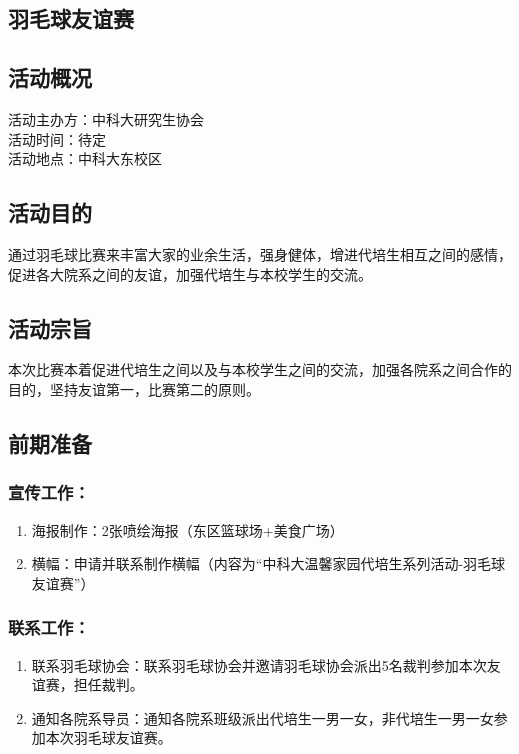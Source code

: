 \documentclass{article}
\begin{document}
\begin{CJK}{UTF8}{gbsn}

	\section{羽毛球友谊赛}
	\subsection{活动概况}
		活动主办方：中科大研究生协会\\
		活动时间：待定\\
		活动地点：中科大东校区\\
	\subsection{活动目的}
通过羽毛球比赛来丰富大家的业余生活，强身健体，增进代培生相互之间的感情，促进各大院系之间的友谊，加强代培生与本校学生的交流。

\subsection{活动宗旨}
本次比赛本着促进代培生之间以及与本校学生之间的交流，加强各院系之间合作的目的，坚持友谊第一，比赛第二的原则。

\subsection{前期准备}
\subsubsection{宣传工作：}
\begin{enumerate}
	\item 海报制作：2张喷绘海报（东区篮球场+美食广场）
	\item 横幅：申请并联系制作横幅（内容为“中科大温馨家园代培生系列活动-羽毛球友谊赛”）
\end{enumerate}

\subsubsection{联系工作：}
\begin{enumerate}
	\item 联系羽毛球协会：联系羽毛球协会并邀请羽毛球协会派出5名裁判参加本次友谊赛，担任裁判。
	\item 通知各院系导员：通知各院系班级派出代培生一男一女，非代培生一男一女参加本次羽毛球友谊赛。
\end{enumerate}


\end{CJK}
\end{document}
